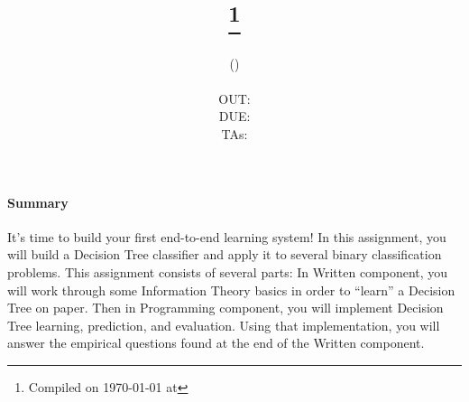 \documentclass[11pt,addpoints,answers]{exam}
\title{\textsc{\hwNum}\\
\textsc{\hwTopic}
\thanks{Compiled on \today{} at \currenttime{}}\\
\vspace{1em}
} %
\author{\textsc{\large \courseNum{} \courseName{} (\courseSem)}\\
\courseUrl
\vspace{1em}\\
  OUT: \outDate \\
  DUE: \dueDate \\
  TAs: \taNames\\
}
\date{}
\date{}
\begin{document}
\maketitle

\begin{notebox}
\paragraph{Summary} It's time to build your first end-to-end learning system! In this assignment, you will build a Decision Tree classifier and apply it to several binary classification problems. This assignment consists of several parts: In Written component, you will work through some Information Theory basics in order to ``learn'' a Decision Tree on paper. Then in Programming component, you will implement Decision Tree learning, prediction, and evaluation. Using that implementation, you will answer the empirical questions found at the end of the Written component.
\end{notebox}
\end{document}
